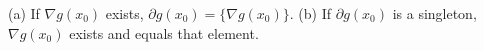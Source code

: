 (a) If $\nabla g(x_0)$ exists, $\partial g(x_0)=\{\nabla g(x_0)\}$. (b) If $\partial g(x_0)$ is a singleton, $\nabla g(x_0)$ exists and equals that element.
